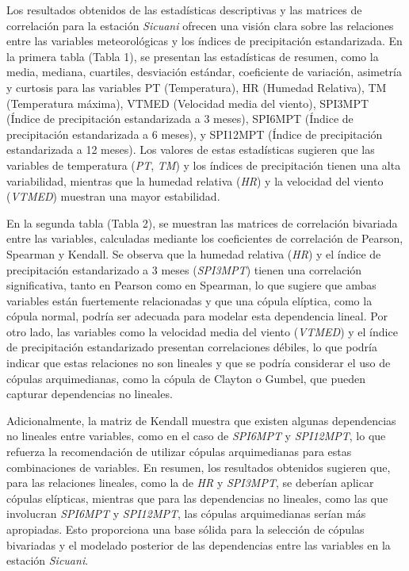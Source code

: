 \begin{figure}[htbp]
\end{figure}


Los resultados obtenidos de las estadísticas descriptivas y las matrices de correlación para la estación \textit{Sicuani} ofrecen una visión clara sobre las relaciones entre las variables meteorológicas y los índices de precipitación estandarizada. En la primera tabla (Tabla 1), se presentan las estadísticas de resumen, como la media, mediana, cuartiles, desviación estándar, coeficiente de variación, asimetría y curtosis para las variables PT (Temperatura), HR (Humedad Relativa), TM (Temperatura máxima), VTMED (Velocidad media del viento), SPI3MPT (Índice de precipitación estandarizada a 3 meses), SPI6MPT (Índice de precipitación estandarizada a 6 meses), y SPI12MPT (Índice de precipitación estandarizada a 12 meses). Los valores de estas estadísticas sugieren que las variables de temperatura (\textit{PT}, \textit{TM}) y los índices de precipitación tienen una alta variabilidad, mientras que la humedad relativa (\textit{HR}) y la velocidad del viento (\textit{VTMED}) muestran una mayor estabilidad.

En la segunda tabla (Tabla 2), se muestran las matrices de correlación bivariada entre las variables, calculadas mediante los coeficientes de correlación de Pearson, Spearman y Kendall. Se observa que la humedad relativa (\textit{HR}) y el índice de precipitación estandarizado a 3 meses (\textit{SPI3MPT}) tienen una correlación significativa, tanto en Pearson como en Spearman, lo que sugiere que ambas variables están fuertemente relacionadas y que una cópula elíptica, como la cópula normal, podría ser adecuada para modelar esta dependencia lineal. Por otro lado, las variables como la velocidad media del viento (\textit{VTMED}) y el índice de precipitación estandarizado presentan correlaciones débiles, lo que podría indicar que estas relaciones no son lineales y que se podría considerar el uso de cópulas arquimedianas, como la cópula de Clayton o Gumbel, que pueden capturar dependencias no lineales.

Adicionalmente, la matriz de Kendall muestra que existen algunas dependencias no lineales entre variables, como en el caso de \textit{SPI6MPT} y \textit{SPI12MPT}, lo que refuerza la recomendación de utilizar cópulas arquimedianas para estas combinaciones de variables. En resumen, los resultados obtenidos sugieren que, para las relaciones lineales, como la de \textit{HR} y \textit{SPI3MPT}, se deberían aplicar cópulas elípticas, mientras que para las dependencias no lineales, como las que involucran \textit{SPI6MPT} y \textit{SPI12MPT}, las cópulas arquimedianas serían más apropiadas. Esto proporciona una base sólida para la selección de cópulas bivariadas y el modelado posterior de las dependencias entre las variables en la estación \textit{Sicuani}.



